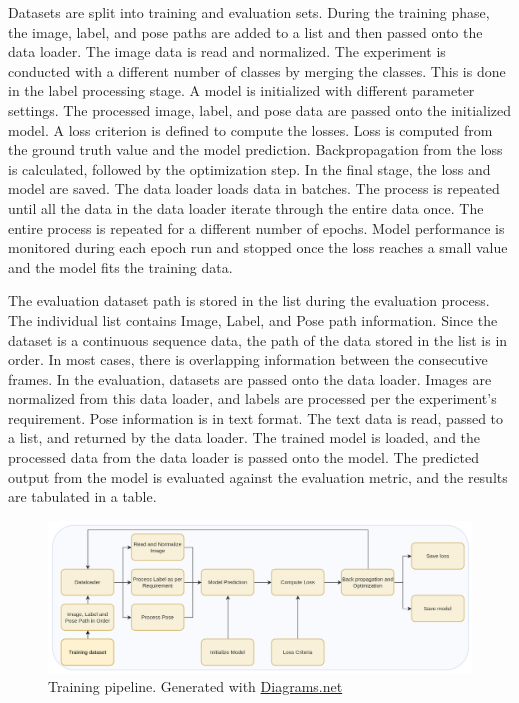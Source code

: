     Datasets are split into training and evaluation sets. During the training phase, the image, label, and pose paths are added to a list and then passed onto the data loader. The image data is read and normalized. The experiment is conducted with a different number of classes by merging the classes. This is done in the label processing stage. A model is initialized with different parameter settings. The processed image, label, and pose data are passed onto the initialized model. A loss criterion is defined to compute the losses. Loss is computed from the ground truth value and the model prediction. Backpropagation from the loss is calculated, followed by the optimization step. In the final stage, the loss and model are saved. The data loader loads data in batches. The process is repeated until all the data in the data loader iterate through the entire data once. The entire process is repeated for a different number of epochs. Model performance is monitored during each epoch run and stopped once the loss reaches a small value and the model fits the training data. 

	The evaluation dataset path is stored in the list during the evaluation process. The individual list contains Image, Label, and Pose path information. Since the dataset is a continuous sequence data, the path of the data stored in the list is in order. In most cases, there is overlapping information between the consecutive frames. In the evaluation, datasets are passed onto the data loader. Images are normalized from this data loader, and labels are processed per the experiment's requirement. Pose information is in text format. The text data is read, passed to a list, and returned by the data loader. The trained model is loaded, and the processed data from the data loader is passed onto the model. The predicted output from the model is evaluated against the evaluation metric, and the results are tabulated in a table.      
    
    
   	\begin{figure}
    	\centering
    	\includegraphics[width=14cm]{images/training.png}
    	\caption{Training pipeline. Generated with \href{https://app.diagrams.net/}{Diagrams.net}}
    	\label{fig:unet_training}
    \end{figure}

